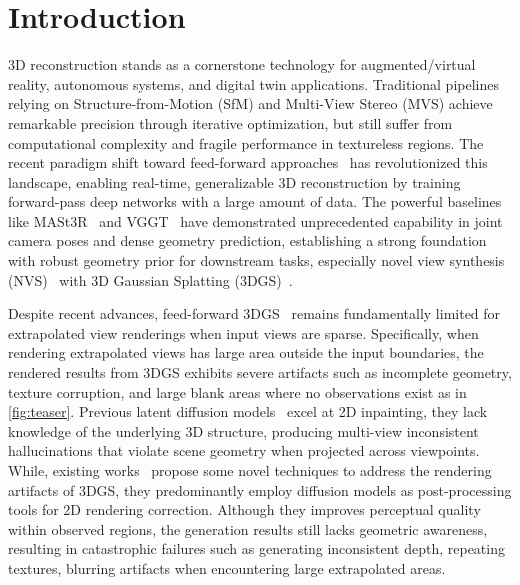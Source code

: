 \section{Introduction}
\label{sec:intro}
3D reconstruction stands as a cornerstone technology for augmented/virtual reality, autonomous systems, and digital twin applications. Traditional pipelines~\cite{schonberger2016structure, mur2015orb} relying on Structure-from-Motion (SfM) and Multi-View Stereo (MVS) achieve remarkable precision through iterative optimization, but still suffer from computational complexity and fragile performance in textureless regions. The recent paradigm shift toward feed-forward approaches~\cite{dust3r_cvpr24, leroy2024mast3r, wang2025vggt, keetha2025mapanything, wang2025pi3} has revolutionized this landscape, enabling real-time, generalizable 3D reconstruction by training forward-pass deep networks with a large amount of data. The powerful baselines like MASt3R~\cite{leroy2024mast3r} and VGGT~\cite{wang2025vggt} have demonstrated unprecedented capability in joint camera poses and dense geometry prediction, establishing a strong foundation with robust geometry prior for downstream tasks, especially novel view synthesis (NVS)~\cite{wang2025volsplat, jiang2025anysplat, ye2024nopo} with 3D Gaussian Splatting (3DGS)~\cite{kerbl3Dgaussians}.

Despite recent advances, feed-forward 3DGS~\cite{wang2025volsplat, jiang2025anysplat, ye2024nopo} remains fundamentally limited for extrapolated view renderings when input views are sparse. Specifically, when rendering extrapolated views has large area outside the input boundaries, the rendered results from 3DGS exhibits severe artifacts such as incomplete geometry, texture corruption, and large blank areas where no observations exist as in \cref{fig:teaser}. Previous latent diffusion models~\cite{Rombach_2022_SD2, suvorov2021resolutionLaMa} excel at 2D inpainting, they lack knowledge of the underlying 3D structure, producing {multi-view inconsistent} hallucinations that violate scene geometry when projected across viewpoints. While, existing works~\cite{wu2025difix3d+,zhong2025taming,fischer2025flowr,wei2025gsfix3d,yin2025gsfixer} propose some novel techniques to address the rendering artifacts of 3DGS, they predominantly employ diffusion models as post-processing tools for 2D rendering correction. Although they improves perceptual quality within observed regions, the generation results still lacks geometric awareness, resulting in catastrophic failures such as generating inconsistent depth, repeating textures, blurring artifacts when encountering large extrapolated areas.


